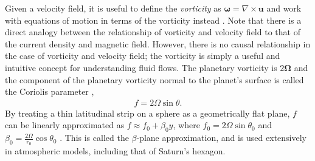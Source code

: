\documentclass[preprint]{revtex4-1} %
\begin{document}
Given a velocity field, it is useful to define the \textit{vorticity} as
$\boldsymbol{\omega} = \nabla \times \textbf{u}$ and work with
equations of motion in terms of the vorticity instead
\cite{Batchelor67, Pedlosky87}.  Note that there is a direct analogy
between the relationship of vorticity and velocity field to that of
the current density and magnetic field.  However, there is no causal
relationship in the case of vorticity and velocity field; the
vorticity is simply a useful and intuitive concept for understanding
fluid flows.  The planetary vorticity is $2\boldsymbol{\Omega}$ and
the component of the planetary vorticity normal to the planet's
surface is called the Coriolis parameter \cite{Pedlosky87},
\begin{align}
  \label{eq:coriolisf}
  f = 2\Omega \sin \theta.
\end{align}
By treating a thin latitudinal strip on a sphere
as a geometrically flat plane, $f$ can be linearly approximated as $f
\approx f_0+\beta_0y$, where $f_0 = 2\Omega \sin \theta_0$ and $\beta_0 =
\frac{2\Omega}{r_0} \cos \theta_0$ \cite{Pedlosky87}.  This is called
the $\beta$-plane 
approximation, and is used extensively in atmospheric models,
including that of Saturn's hexagon.
\end{document}
